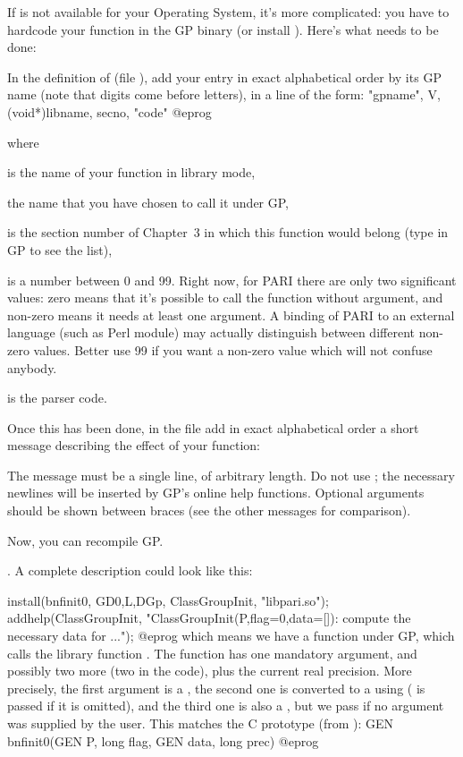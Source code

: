 
If  is not available for your Operating System, it's more
complicated: you have to hardcode your function in the GP binary (or
install ). Here's what needs to be done: 

In the definition of  (file ),
add your entry in exact alphabetical order by its GP name (note that digits
come before letters), in a line of the form:
\bprog
{ "gpname", V, (void*)libname, secno, "code" }
@eprog

\noindent where

 is the name of your function in library mode,

 the name that you have chosen to call it under GP,

 is the section number of Chapter~3 in which this function would
belong (type  in GP to see the list),

 is a number between 0 and 99. Right now, for PARI there are only two
significant values: zero means that it's possible to call the function
without argument, and non-zero means it needs at least one argument.
A binding of PARI to an external language (such as 
Perl module) may actually distinguish between different non-zero values.
Better use 99 if you want a non-zero value which will not confuse anybody.

 is the parser code.

Once this has been done, in the file  add in
exact alphabetical order a short message describing the effect of your
function:

The message must be a single line, of arbitrary length. Do not use
; the necessary newlines will be inserted by GP's online help
functions. Optional arguments should be shown between braces (see the other
messages for comparison).\smallskip

Now, you can recompile GP.

.
%
A complete description could look like this:

\bprog
{
  install(bnfinit0, GD0,L,DGp, ClassGroupInit, "libpari.so");
  addhelp(ClassGroupInit, "ClassGroupInit(P,{flag=0},{data=[]}):
    compute the necessary data for ...");
}
@eprog
which means we have a function  under GP, which calls
the library function  . The function has one mandatory
argument, and possibly two more (two  in the code), plus the
current real precision. More precisely, the first argument is a ,
the second one is converted to a  using  ( is
passed if it is omitted), and the third one is also a , but we
pass  if no argument was supplied by the user. This matches the C
prototype (from ):
%
\bprog
  GEN bnfinit0(GEN P, long flag, GEN data, long prec)
@eprog

